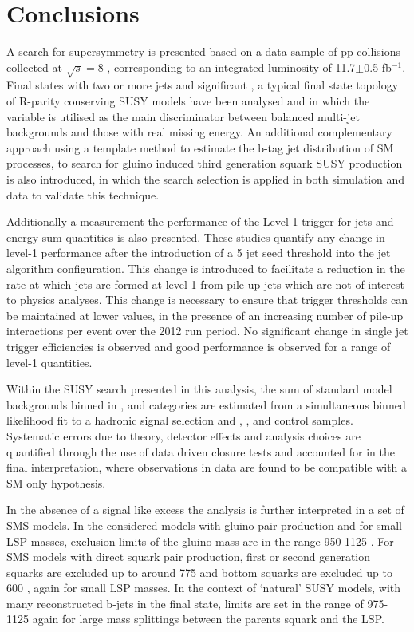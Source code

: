 \chapter{Conclusions}
\label{chap:conclusions}

A search for supersymmetry is presented based on a data sample of pp collisions collected at $\sqrt{s} = 8$ \TeV, corresponding to an integrated luminosity of 11.7$\pm$0.5 fb$^{-1}$. 
Final states with two or more jets and significant \met, a typical final state topology of R-parity conserving \ac{SUSY} models have been analysed and in which the \alphat variable is utilised as the main discriminator between balanced multi-jet backgrounds and those with real missing energy. An additional complementary approach using a template method to estimate the b-tag jet distribution of \ac{SM} processes, to search for gluino induced third generation squark \ac{SUSY} production is also introduced, in which the \alphat search selection is applied in both simulation and data to validate this technique.

 Additionally a measurement the performance of the Level-1 trigger for jets and energy sum quantities is also presented. These studies quantify any change in level-1 performance after the introduction of a 5 \GeV jet seed threshold into the jet algorithm configuration. This change is introduced to facilitate a reduction in the rate at which jets are formed at level-1 from pile-up jets which are not of interest to physics analyses. This change is necessary to ensure that trigger thresholds can be maintained at lower values, in the presence of an increasing number of pile-up interactions per event over the 2012 run period. No significant change in single jet trigger efficiencies is observed and good performance is observed for a range of level-1 quantities.

Within the \ac{SUSY} search presented in this analysis, the sum of standard model backgrounds binned in \theht, \nbreco and \njet categories are estimated from a simultaneous binned likelihood fit to a hadronic signal selection and \mupjets, \dimupjets, and \gpjets control samples. Systematic errors due to theory, detector effects and analysis choices are quantified through the use of data driven closure tests and accounted for in the final interpretation,  where observations in data are found to be compatible with a \ac{SM} only hypothesis. 

In the absence of a signal like excess the analysis is further interpreted in a set of \ac{SMS} models. In the considered models with gluino pair production and for small \ac{LSP} masses, exclusion limits of the gluino mass are in the range 950-1125 \GeV. For \ac{SMS} models with direct squark pair production, first or second generation squarks are excluded up to around 775 \GeV and bottom squarks are excluded up to 600 \GeV, again for small \ac{LSP} masses. In the context of `natural' \ac{SUSY} models, with many reconstructed b-jets in the final state, limits are set in the range of 975-1125 \GeV again for large mass splittings between the parents squark and the \ac{LSP}. 

